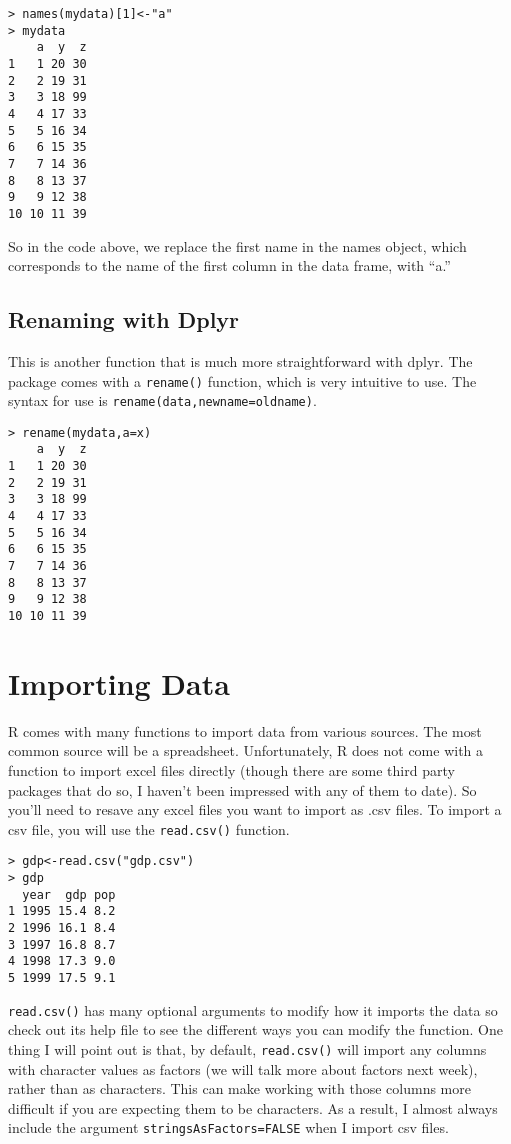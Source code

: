 \documentclass[12pt, oneside]{amsart}   	%
\begin{document}
\begin{verbatim}
> names(mydata)[1]<-"a"
> mydata
    a  y  z
1   1 20 30
2   2 19 31
3   3 18 99
4   4 17 33
5   5 16 34
6   6 15 35
7   7 14 36
8   8 13 37
9   9 12 38
10 10 11 39
\end{verbatim}

So in the code above, we replace the first name in the names object, which corresponds to the name of the first column in the data frame, with ``a.'' 

\subsection{Renaming with Dplyr}

This is another function that is much more straightforward with dplyr. The package comes with a \texttt{rename()} function, which is very intuitive to use. The syntax for use is \texttt{rename(data,newname=oldname)}.

\begin{verbatim}
> rename(mydata,a=x)
    a  y  z
1   1 20 30
2   2 19 31
3   3 18 99
4   4 17 33
5   5 16 34
6   6 15 35
7   7 14 36
8   8 13 37
9   9 12 38
10 10 11 39
\end{verbatim}

\section{Importing Data}

R comes with many functions to import data from various sources. The most common source will be a spreadsheet. Unfortunately, R does not come with a function to import excel files directly (though there are some third party packages that do so, I haven't been impressed with any of them to date). So you'll need to resave any excel files you want to import as .csv files. To import a csv file, you will use the \texttt{read.csv()} function. 

\begin{verbatim}
> gdp<-read.csv("gdp.csv")
> gdp
  year  gdp pop
1 1995 15.4 8.2
2 1996 16.1 8.4
3 1997 16.8 8.7
4 1998 17.3 9.0
5 1999 17.5 9.1
\end{verbatim}

\texttt{read.csv()} has many optional arguments to modify how it imports the data so check out its help file to see the different ways you can modify the function. One thing I will point out is that, by default, \texttt{read.csv()} will import any columns with character values as factors (we will talk more about factors next week), rather than as characters. This can make working with those columns more difficult if you are expecting them to be characters. As a result, I almost always include the argument \texttt{stringsAsFactors=FALSE} when I import csv files.
\end{document}
